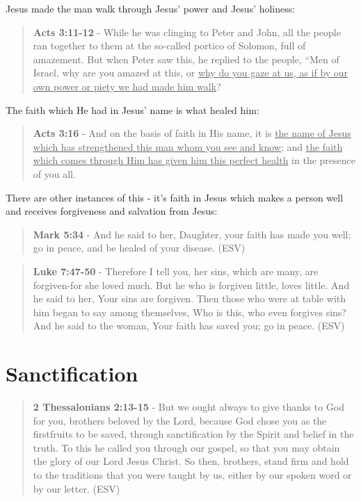 \documentclass[11pt]{article}
\begin{document}
Jesus made the man walk through Jesus' power and Jesus' holiness:

\begin{quote}
\textbf{Acts 3:11-12} - While he was clinging to Peter and John, all the people ran together to them at the so-called portico of Solomon, full of amazement. But when Peter saw this, he replied to the people, “Men of Israel, why are you amazed at this, or \uline{why do you gaze at us, as if by our own power or piety we had made him walk}?
\end{quote}

The faith which He had in Jesus' name is what healed him:

\begin{quote}
\textbf{Acts 3:16} - And on the basis of faith in His name, it is \uline{the name of Jesus which has strengthened this man whom you see and know}; and \uline{the faith which comes through Him has given him this perfect health} in the presence of you all.
\end{quote}

There are other instances of this - it's faith in Jesus which makes a person well and receives forgiveness and salvation from Jesus:

\begin{quote}
\textbf{Mark 5:34} -  And he said to her, Daughter, your faith has made you well; go in peace, and be healed of your disease.  (ESV)
\end{quote}

\begin{quote}
\textbf{Luke 7:47-50} - Therefore I tell you, her sins, which are many, are forgiven-for she loved much. But he who is forgiven little, loves little. And he said to her, Your sins are forgiven. Then those who were at table with him began to say among themselves, Who is this, who even forgives sins? And he said to the woman, Your faith has saved you; go in peace. (ESV)
\end{quote}

\section{Sanctification}
\label{sec:org12f55f9}
\begin{quote}
\textbf{2 Thessalonians 2:13-15} -  But we ought always to give thanks to God for you, brothers beloved by the Lord, because God chose you as the firstfruits to be saved, through sanctification by the Spirit and belief in the truth.  To this he called you through our gospel, so that you may obtain the glory of our Lord Jesus Christ.  So then, brothers, stand firm and hold to the traditions that you were taught by us, either by our spoken word or by our letter.  (ESV)
\end{quote}
\end{document}
